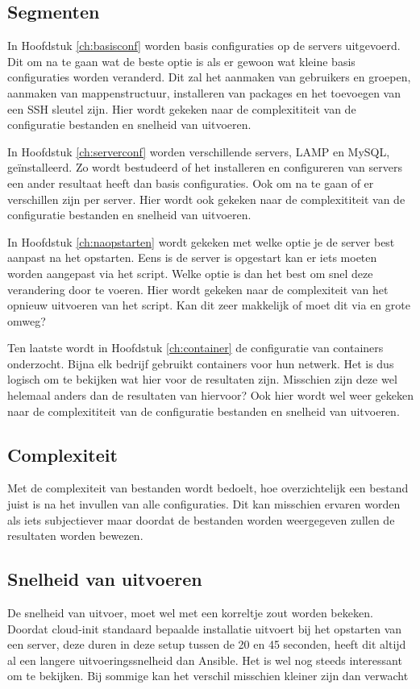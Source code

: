 \subsection{Segmenten}
In Hoofdstuk \ref*{ch:basisconf} worden basis configuraties op de servers uitgevoerd. Dit om na te gaan wat de beste optie is als er gewoon wat kleine basis configuraties worden veranderd. Dit zal het aanmaken van gebruikers en groepen, aanmaken van mappenstructuur, installeren van packages en het toevoegen van een SSH sleutel zijn. Hier wordt gekeken naar de complexititeit van de configuratie bestanden en snelheid van uitvoeren.

In Hoofdstuk \ref*{ch:serverconf} worden verschillende servers, LAMP en MySQL, geïnstalleerd. Zo wordt bestudeerd of het installeren en configureren van servers een ander resultaat heeft dan basis configuraties. Ook om na te gaan of er verschillen zijn per server. Hier wordt ook gekeken naar de complexititeit van de configuratie bestanden en snelheid van uitvoeren.

In Hoofdstuk \ref*{ch:naopstarten} wordt gekeken met welke optie je de server best aanpast na het opstarten. Eens is de server is opgestart kan er iets moeten worden aangepast via het script. Welke optie is dan het best om snel deze verandering door te voeren. Hier wordt gekeken naar de complexiteit van het opnieuw uitvoeren van het script. Kan dit zeer makkelijk of moet dit via en grote omweg?

Ten laatste wordt in Hoofdstuk \ref*{ch:container} de configuratie van containers onderzocht. Bijna elk bedrijf gebruikt containers voor hun netwerk. Het is dus logisch om te bekijken wat hier voor de resultaten zijn. Misschien zijn deze wel helemaal anders dan de resultaten van hiervoor? Ook hier wordt wel weer gekeken naar de complexititeit van de configuratie bestanden en snelheid van uitvoeren.

\subsection{Complexiteit}
Met de complexiteit van bestanden wordt bedoelt, hoe overzichtelijk een bestand juist is na het invullen van alle configuraties. Dit kan misschien ervaren worden als iets subjectiever maar doordat de bestanden worden weergegeven zullen de resultaten worden bewezen.

\subsection{Snelheid van uitvoeren}
De snelheid van uitvoer, moet wel met een korreltje zout worden bekeken. Doordat cloud-init standaard bepaalde installatie uitvoert bij het opstarten van een server, deze duren in deze setup tussen de 20 en 45 seconden, heeft dit altijd al een langere uitvoeringssnelheid dan Ansible. Het is wel nog steeds interessant om te bekijken. Bij sommige kan het verschil misschien kleiner zijn dan verwacht


